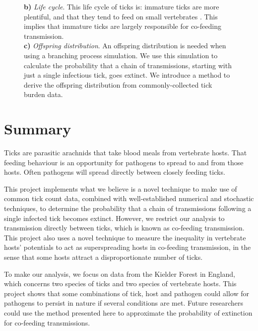 \documentclass[hidelinks]{article}
\begin{document}
\begin{figure}[h!]
\begin{mdframed}[backgroundcolor=grey250,rightline=false,leftline=false,topline=false]
{	    \textbf{b)} \textit{Life cycle}. This life cycle of ticks is: immature ticks are more plentiful, and that they tend to feed on small vertebrates \citep{Randolph1998}. This implies that immature ticks are largely responsible for co-feeding transmission. \\
	    \textbf{c)} \textit{Offspring distribution}. An offspring distribution is needed when using a branching process simulation. We use this simulation to calculate the probability that a chain of transmissions, starting with just a single infectious tick, goes extinct. We introduce a method to derive the offspring distribution from commonly-collected tick burden data.}
	    \label{fig:graphical_abstract}
	\end{mdframed}
\end{figure}

\thispagestyle{empty}
\addtocounter{page}{-1}

\newpage

\section*{Summary}

Ticks are parasitic arachnids that take blood meals from vertebrate hosts. That feeding behaviour is an opportunity for pathogens to spread to and from those hosts. Often pathogens will spread directly between closely feeding ticks.

This project implements what we believe is a novel technique to make use of common tick count data, combined with well-established numerical and stochastic techniques, to determine the probability that a chain of transmissions following a single infected tick becomes extinct. However, we restrict our analysis to transmission directly between ticks, which is known as co-feeding transmission. This project also uses a novel technique to measure the inequality in vertebrate hosts' potentials to act as superspreading hosts in co-feeding transmission, in the sense that some hosts attract a disproportionate number of ticks.

To make our analysis, we focus on data from the Kielder Forest in England, which concerns two species of ticks and two species of vertebrate hosts. This project shows that some combinations of tick, host and pathogen could allow for pathogens to persist in nature if several conditions are met. Future researchers could use the method presented here to approximate the probability of extinction for co-feeding transmissions.
\end{document}
